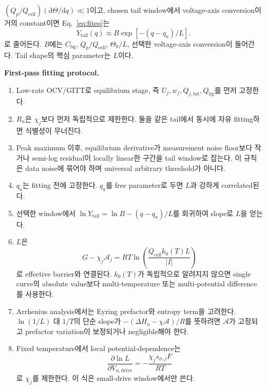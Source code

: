 \documentclass[11pt,a4paper]{article}
\newcommand{\dd}{\mathrm{d}}
\newcommand{\drive}{\mathrm{drive}}
\newcommand{\bg}{\mathrm{bg}}
\newcommand{\cell}{\mathrm{cell}}
\newcommand{\tot}{\mathrm{tot}}
\newcommand{\tail}{\mathrm{tail}}
\begin{document}
$(Q_p/Q_{\cell})(\dd\Theta/\dd q)\ll1$이고, chosen tail window에서 voltage-axis conversion이 거의 constant이면
Eq.~\eqref{eq:fiteq}는
\begin{equation}
\boxed{\;Y_{\tail}(q)\approx B\exp[-(q-q_a)/L].\;}
\label{eq:Ytail_simple}
\end{equation}
로 줄어든다. $B$에는 $C_{\bg}$, $Q_p/Q_{\cell}$, $\Theta_0/L$, 선택한 voltage-axis conversion이 들어간다. Tail shape의
핵심 parameter는 $L$이다.

\textbf{First-pass fitting protocol.}
\begin{enumerate}[label=\textbf{F\arabic*.},leftmargin=2.4em]
\item Low-rate OCV/GITT로 equilibrium stage, 즉 $U_j,w_j,Q_{j,\tot},Q_{\bg}$를 먼저 고정한다.
\item $R_n$은 $\chi_j$보다 먼저 독립적으로 제한한다. 둘을 같은 tail에서 동시에 자유 fitting하면 식별성이 무너진다.
\item Peak maximum 이후, equilibrium derivative가 measurement noise floor보다 작거나 semi-log residual이 locally linear한 구간을 tail window로 잡는다. 이 규칙은 data noise에 묶어야 하며 universal arbitrary threshold가 아니다.
\item $q_a$는 fitting 전에 고정한다. $q_a$를 free parameter로 두면 $L$과 강하게 correlated된다.
\item 선택한 window에서 $\ln Y_{\tail}=\ln B-(q-q_a)/L$를 회귀하여 slope로 $L$을 얻는다.
\item $L$은
\begin{equation}
G-\chi_j\mathcal A_j=RT\ln\left(\frac{Q_{\cell}k_0(T)L}{|I|}\right)
\label{eq:barrier_from_L}
\end{equation}
로 effective barrier와 연결된다. $k_0(T)$가 독립적으로 알려지지 않으면 single curve의 absolute value보다 multi-temperature 또는 multi-potential difference를 사용한다.
\item Arrhenius analysis에서는 Eyring prefactor와 entropy term을 고려한다. $\ln(1/L)$ 대 $1/T$의 단순 slope가
$-(\Delta H_a-\chi\mathcal A)/R$를 뜻하려면 $\mathcal A$가 고정되고 prefactor variation이 보정되거나 negligible해야 한다.
\item Fixed temperature에서 local potential-dependence는
\begin{equation}
\frac{\partial\ln L}{\partial V_{n,\drive}}=-\frac{\chi_js_{\phi,j}F}{RT}
\label{eq:chi_slope}
\end{equation}
로 $\chi_j$를 제한한다. 이 식은 small-drive window에서만 쓴다.
\end{enumerate}
\end{document}
